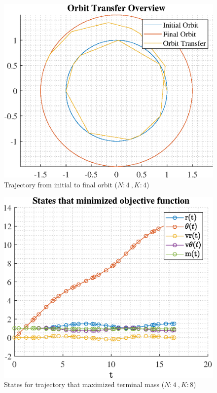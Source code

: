 \documentclass[]{article}
\begin{document}
\begin{figure}
	\centering
	\includegraphics[scale=0.75]{orbit_N4_K4_C2_mf.eps}
	\caption{Trajectory from initial to final orbit (\(N:4\ , K:4\))}
	\label{fig:orbit_N4_K4_C2_mf}
\end{figure}
\begin{figure}
	\centering
	\includegraphics[scale=0.75]{states_N4_K8_C2_mf.eps}
	\caption{States for trajectory that maximized terminal mass (\(N:4\ , K:8\))}
	\label{fig:states_N4_K8_C2_mf}
\end{figure}
\end{document}
